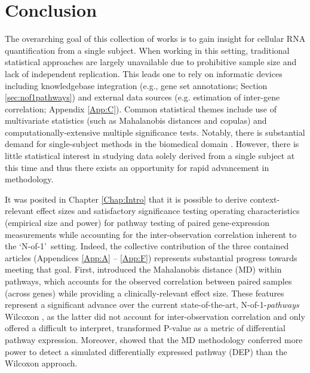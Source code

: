 \chapter{Conclusion}\label{Chap:conclusion}



\indent\indent The overarching goal of this collection of works is to gain insight for cellular RNA quantification from a single subject. When working in this setting, traditional statistical approaches are largely unavailable due to prohibitive sample size and lack of independent replication. This leads one to rely on informatic devices including knowledgebase integration (e.g., gene set annotations; Section \ref{sec:nof1pathways}) and external data sources (e.g. estimation of inter-gene correlation; Appendix \ref{App:C}). Common statistical themes include use of multivariate statistics (such as Mahalanobis distances and copulas) and computationally-extensive multiple significance tests. Notably, there is substantial demand for single-subject methods in the biomedical domain \citep{Bacchetti2011}. However, there is little statistical interest in studying data solely derived from a single subject at this time and thus there exists an opportunity for rapid advancement in methodology.

It was posited in Chapter \ref{Chap:Intro} that it is possible to derive context-relevant effect sizes and satisfactory significance testing operating characteristics (empirical size and power) for pathway testing of paired gene-expression measurements while accounting for the inter-observation correlation inherent to the \lq N-of-1\rq~setting. Indeed, the collective contribution of the three contained articles (Appendices \ref{App:A} -- \ref{App:F}) represents substantial progress towards meeting that goal. First, \citet{Schissler2015} introduced the Mahalanobis distance (MD) within pathways, which accounts for the observed correlation between paired samples (across genes) while providing a clinically-relevant effect size. These features represent a significant advance over the current state-of-the-art, N-of-1-\emph{pathways} Wilcoxon \citep{Gardeux2014}, as the latter did not account for inter-observation correlation and only offered a difficult to interpret, transformed P-value as a metric of differential pathway expression. Moreover, \citet{Schissler2015} showed that the MD methodology conferred more power to detect a simulated differentially expressed pathway (DEP) than the Wilcoxon approach.

